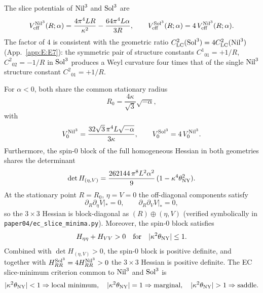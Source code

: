 The slice potentials of $\mathrm{Nil}^3$ and $\mathrm{Sol}^3$ are
\begin{equation}
  V_{\mathrm{eff}}^{\mathrm{Nil}^3}(R;\alpha)
  = \frac{4\pi^4 L R}{\kappa^2} - \frac{64\pi^4 L\alpha}{3 R},
  \qquad
  V_{\mathrm{eff}}^{\mathrm{Sol}^3}(R;\alpha) = 4\,V_{\mathrm{eff}}^{\mathrm{Nil}^3}(R;\alpha).
\end{equation}
The factor of $4$ is consistent with the geometric ratio
$C^2_{\mathrm{LC}}(\mathrm{Sol}^3) = 4 C^2_{\mathrm{LC}}(\mathrm{Nil}^3)$
(App.~\ref{app:E:E7}): the symmetric pair of structure constants
$C^1{}_{01} = +1/R$, $C^2{}_{02} = -1/R$ in $\mathrm{Sol}^3$ produces a Weyl
curvature four times that of the single $\mathrm{Nil}^3$ structure constant
$C^2{}_{01} = +1/R$.

For $\alpha < 0$, both share the common stationary radius
\begin{equation}
  R_0 = \frac{4\kappa}{\sqrt{3}}\sqrt{-\alpha},
\end{equation}
with
\begin{equation}
  V_0^{\mathrm{Nil}^3} = \frac{32\sqrt{3}\,\pi^4 L\sqrt{-\alpha}}{3\kappa},
  \qquad
  V_0^{\mathrm{Sol}^3} = 4\,V_0^{\mathrm{Nil}^3}.
\end{equation}
Furthermore, the spin-0 block of the full homogeneous Hessian in both
geometries shares the determinant
\begin{equation}
  \det H_{(\eta, V)}
  = \frac{262144\,\pi^8 L^2 \alpha^2}{9}\,(1 - \kappa^4\theta_{\mathrm{NY}}^2).
\end{equation}
At the stationary point $R = R_0$, $\eta = V = 0$ the off-diagonal
components satisfy
\begin{equation}
  \partial_R\partial_\eta V|_* = 0, \qquad
  \partial_R\partial_V V|_* = 0,
\end{equation}
so the $3\times 3$ Hessian is block-diagonal as $(R)\oplus(\eta, V)$
(verified symbolically in\\
\texttt{paper04/ec\_slice\_minima.py}).  Moreover, the spin-0 block satisfies
\begin{equation}
  H_{\eta\eta} + H_{VV} > 0
  \quad\text{for}\quad
  |\kappa^2\theta_{\mathrm{NY}}|\le 1.
\end{equation}
Combined with $\det H_{(\eta, V)} > 0$, the spin-0 block is positive
definite, and together with $H_{RR}^{\mathrm{Sol}^3} = 4 H_{RR}^{\mathrm{Nil}^3} > 0$
the $3\times 3$ Hessian is positive definite.  The EC slice-minimum
criterion common to $\mathrm{Nil}^3$ and $\mathrm{Sol}^3$ is
\begin{equation}
  |\kappa^2\theta_{\mathrm{NY}}| < 1 \Rightarrow \text{local minimum},
  \quad
  |\kappa^2\theta_{\mathrm{NY}}| = 1 \Rightarrow \text{marginal},
  \quad
  |\kappa^2\theta_{\mathrm{NY}}| > 1 \Rightarrow \text{saddle}.
\end{equation}

